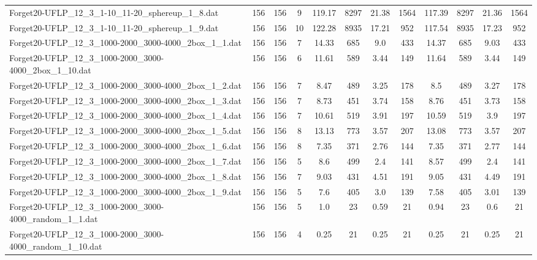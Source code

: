 \begin{sidewaystable}[!ht]
{\begin{tabular}{lccccccccccc}
Forget20-UFLP\_12\_3\_1-10\_11-20\_sphereup\_1\_8.dat & 156 & 156 & 9 & 119.17 & 8297 & 21.38 & 1564 & 117.39 & 8297 & 21.36 & 1564 \\
Forget20-UFLP\_12\_3\_1-10\_11-20\_sphereup\_1\_9.dat & 156 & 156 & 10 & 122.28 & 8935 &  \textcolor{blue2}{17.21} & 952 & 117.54 & 8935 & 17.23 & 952 \\
Forget20-UFLP\_12\_3\_1000-2000\_3000-4000\_2box\_1\_1.dat & 156 & 156 & 7 & 14.33 & 685 &  \textcolor{blue2}{9.0} & 433 & 14.37 & 685 & 9.03 & 433 \\
Forget20-UFLP\_12\_3\_1000-2000\_3000-4000\_2box\_1\_10.dat & 156 & 156 & 6 & 11.61 & 589 &  \textcolor{blue2}{3.44} & 149 & 11.64 & 589 &  \textcolor{blue2}{3.44} & 149 \\
Forget20-UFLP\_12\_3\_1000-2000\_3000-4000\_2box\_1\_2.dat & 156 & 156 & 7 & 8.47 & 489 &  \textcolor{blue2}{3.25} & 178 & 8.5 & 489 & 3.27 & 178 \\
Forget20-UFLP\_12\_3\_1000-2000\_3000-4000\_2box\_1\_3.dat & 156 & 156 & 7 & 8.73 & 451 & 3.74 & 158 & 8.76 & 451 &  \textcolor{blue2}{3.73} & 158 \\
Forget20-UFLP\_12\_3\_1000-2000\_3000-4000\_2box\_1\_4.dat & 156 & 156 & 7 & 10.61 & 519 & 3.91 & 197 & 10.59 & 519 &  \textcolor{blue2}{3.9} & 197 \\
Forget20-UFLP\_12\_3\_1000-2000\_3000-4000\_2box\_1\_5.dat & 156 & 156 & 8 & 13.13 & 773 &  \textcolor{blue2}{3.57} & 207 & 13.08 & 773 &  \textcolor{blue2}{3.57} & 207 \\
Forget20-UFLP\_12\_3\_1000-2000\_3000-4000\_2box\_1\_6.dat & 156 & 156 & 8 & 7.35 & 371 & 2.76 & 144 & 7.35 & 371 & 2.77 & 144 \\
Forget20-UFLP\_12\_3\_1000-2000\_3000-4000\_2box\_1\_7.dat & 156 & 156 & 5 & 8.6 & 499 &  \textcolor{blue2}{2.4} & 141 & 8.57 & 499 &  \textcolor{blue2}{2.4} & 141 \\
Forget20-UFLP\_12\_3\_1000-2000\_3000-4000\_2box\_1\_8.dat & 156 & 156 & 7 & 9.03 & 431 & 4.51 & 191 & 9.05 & 431 &  \textcolor{blue2}{4.49} & 191 \\
Forget20-UFLP\_12\_3\_1000-2000\_3000-4000\_2box\_1\_9.dat & 156 & 156 & 5 & 7.6 & 405 & 3.0 & 139 & 7.58 & 405 & 3.01 & 139 \\
Forget20-UFLP\_12\_3\_1000-2000\_3000-4000\_random\_1\_1.dat & 156 & 156 & 5 & 1.0 & 23 &  \textcolor{blue2}{0.59} & 21 & 0.94 & 23 & 0.6 & 21 \\
Forget20-UFLP\_12\_3\_1000-2000\_3000-4000\_random\_1\_10.dat & 156 & 156 & 4 &  \textcolor{blue2}{0.25} & 21 &  \textcolor{blue2}{0.25} & 21 &  \textcolor{blue2}{0.25} & 21 &  \textcolor{blue2}{0.25} & 21 \\

\end{tabular}}
\end{sidewaystable}
